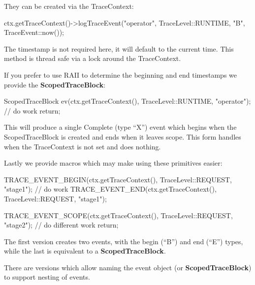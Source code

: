 They can be created via the Trace\+Context\+:


\begin{DoxyCode}
ctx.getTraceContext()->logTraceEvent("operator", TraceLevel::RUNTIME, "B", TraceEvent::now());
\end{DoxyCode}


The timestamp is not required here, it will default to the current time. This method is thread safe via a lock around the Trace\+Context.

If you prefer to use R\+A\+II to determine the beginning and end timestamps we provide the {\bfseries Scoped\+Trace\+Block}\+:


\begin{DoxyCode}
ScopedTraceBlock ev(ctx.getTraceContext(), TraceLevel::RUNTIME, "operator");
// do work
return;
\end{DoxyCode}


This will produce a single Complete (type “\+X”) event which begins when the Scoped\+Trace\+Block is created and ends when it leaves scope. This form handles when the Trace\+Context is not set and does nothing.

Lastly we provide macros which may make using these primitives easier\+:


\begin{DoxyCode}
TRACE\_EVENT\_BEGIN(ctx.getTraceContext(), TraceLevel::REQUEST, "stage1");
// do work
TRACE\_EVENT\_END(ctx.getTraceContext(), TraceLevel::REQUEST, "stage1");

TRACE\_EVENT\_SCOPE(ctx.getTraceContext(), TraceLevel::REQUEST, "stage2");
// do different work
return;
\end{DoxyCode}


The first version creates two events, with the begin (“\+B”) and end (“\+E”) types, while the last is equivalent to a {\bfseries Scoped\+Trace\+Block}.

There are versions which allow naming the event object (or {\bfseries Scoped\+Trace\+Block}) to support nesting of events. 